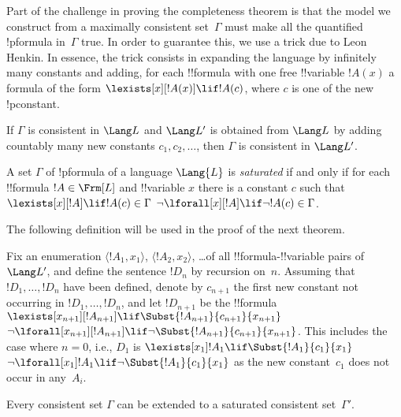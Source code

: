 \documentclass[../../include/open-logic-section]{subfiles}
\begin{document}

\begin{explain}
Part of the challenge in proving the completeness theorem is that the
model we construct from a maximally consistent set~$\Gamma$ must make
all the quantified !p{formula} in~$\Gamma$ true.  In order to
guarantee this, we use a trick due to Leon Henkin.  In essence, the
trick consists in expanding the language by infinitely many constants
and adding, for each !!{formula} with one free !!{variable} $!A(x)$ a
formula of the form $\lexists[x][!A(x)] \lif !A(c)$, where $c$ is one
of the new !p{constant}.
\end{explain}

\begin{lem}
If $\Gamma$ is consistent in $\Lang L$ and $\Lang L'$ is obtained from
$\Lang L$ by adding countably many new constants $c_1, c_2, \dots$,
then $\Gamma$ is consistent in $\Lang L'$.
\end{lem}

\begin{defn}
A set $\Gamma$ of !p{formula} of a language $\Lang {L}$ is
\emph{saturated} if and only if for each !!{formula} $!A \in \Frm[L]$
and !!{variable} $x$ there is a constant $c$ such that
      {$\lexists[x][!A] \lif !A(c) \in \Gamma$}
      {$\lnot\lforall[x][!A] \lif \lnot !A(c) \in \Gamma$}.
\end{defn}

The following definition will be used in the proof of the next theorem.

\begin{defn}
Fix an enumeration $\langle !A_1, x_1 \rangle$, $\langle !A_2, x_2
\rangle$, \dots of all !!{formula}-!!{variable} pairs of $\Lang L'$,
and define the sentence $!D_n$ by recursion on~$n$. Assuming that
$!D_1, \dots, !D_n$ have been defined, denote by $c_{n+1}$ the first
new constant not occurring in $!D_1, \dots, !D_n$, and let $!D_{n+1}$
be the !!{formula} 
{$\lexists[x_{n+1}][!A_{n+1}] \lif \Subst{!A_{n+1}}{c_{n+1}}{x_{n+1}}$}
{$\lnot\lforall[x_{n+1}][!A_{n+1}] \lif \lnot \Subst{!A_{n+1}}{c_{n+1}}{x_{n+1}}$}. 
This includes the case where $n = 0$, i.e., $D_1$ is 
{$\lexists[x_1] !A_1 \lif \Subst{!A_1}{c_1}{x_1}$}
{$\lnot\lforall[x_1] !A_1 \lif \lnot \Subst{!A_1}{c_1}{x_1}$}
as the new constant~$c_1$ does not occur in any~$A_i$.
\end{defn}

\begin{thm}
Every consistent set $\Gamma$ can be extended to a saturated
consistent set~$\Gamma'$.
\end{thm}
\end{document}
